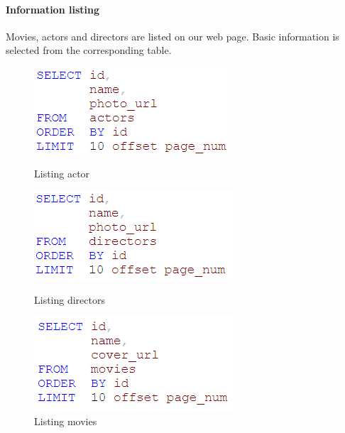 \begin{CJK*}{UTF8}{gbsn}
\paragraph{Information listing}Movies, actors and directors are listed on our web page. Basic information is selected from the corresponding table.
\begin{figure}[htbp]
\centering
\begin{minipage}{0.32\textwidth}
\includegraphics[width=\linewidth]{a_list.png}
\caption{Listing actor}
\end{minipage}
\begin{minipage}{0.32\textwidth}
\includegraphics[width=\linewidth]{dir_list.png}
\caption{Listing directors}
\end{minipage}
\begin{minipage}{0.32\textwidth}
\includegraphics[width=\linewidth]{m_list.png}
\caption{Listing movies}
\end{minipage}
\end{figure}


\end{CJK*}
